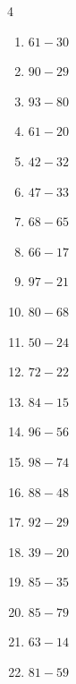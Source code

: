 \begin{multicols}{4}
\begin{enumerate}
  \item $61-30$
        \phantom{$=31$}

  \item $90-29$
        \phantom{$=61$}

  \item $93-80$
        \phantom{$=13$}

  \item $61-20$
        \phantom{$=41$}

  \item $42-32$
        \phantom{$=10$}

  \item $47-33$
        \phantom{$=14$}

  \item $68-65$
        \phantom{$=3$}

  \item $66-17$
        \phantom{$=49$}

  \item $97-21$
        \phantom{$=76$}

  \item $80-68$
        \phantom{$=12$}

  \item $50-24$
        \phantom{$=26$}

\columnbreak %

  \item $72-22$
        \phantom{$=50$}

  \item $84-15$
        \phantom{$=69$}

  \item $96-56$
        \phantom{$=40$}

  \item $98-74$
        \phantom{$=24$}

  \item $88-48$
        \phantom{$=40$}

  \item $92-29$
        \phantom{$=63$}

  \item $39-20$
        \phantom{$=19$}

  \item $85-35$
        \phantom{$=50$}

  \item $85-79$
        \phantom{$=6$}

  \item $63-14$
        \phantom{$=49$}

  \item $81-59$
        \phantom{$=22$}


\end{enumerate}
\end{multicols}
